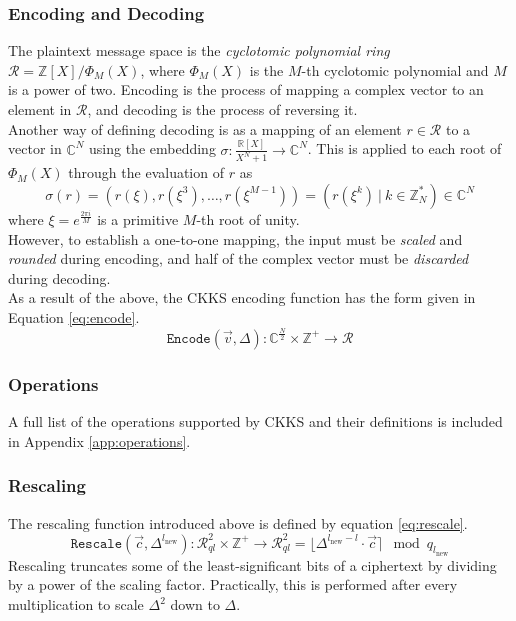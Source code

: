 \subsubsection{Encoding and Decoding}
\setlength{\leftskip}{0.5cm}
\indent \indent
The plaintext message space is the \textit{cyclotomic polynomial ring} $\mathcal{R} = \mathbb{Z}[X] / \Phi_M(X)$, where $\Phi_M(X)$ is the $M$-th cyclotomic polynomial and $M$ is a power of two. Encoding is the process of mapping a complex vector to an element in $\mathcal{R}$, and decoding is the process of reversing it.
\smallskip \\ \indent
Another way of defining decoding is as a mapping of an element $r \in \mathcal{R}$ to a vector in $\mathbb{C}^N$ using the embedding $\sigma : \frac{\mathbb{R}[X]}{X^N + 1} \rightarrow \mathbb{C}^N$. This is applied to each root of $\Phi_M(X)$ through the evaluation of $r$ as
\begin{equation}
    \sigma(r) = (r(\xi), r(\xi^3), \ldots, r(\xi^{M-1})) = (r(\xi^k) \: | \: k \in \mathbb{Z}^*_N) \in \mathbb{C}^N
\end{equation}
where $\xi = e^{\frac{2 \pi i}{M}}$ is a primitive $M$-th root of unity.
\smallskip \\ \indent
However, to establish a one-to-one mapping, the input must be \textit{scaled} and \textit{rounded} during encoding, and half of the complex vector must be \textit{discarded} during decoding.
\smallskip \\ \indent
As a result of the above, the CKKS encoding function has the form given in Equation \ref{eq:encode}.
\begin{equation}
    \label{eq:encode}
    \texttt{Encode}(\vec{v}, \Delta) : \mathbb{C}^\frac{N}{2} \times \mathbb{Z}^+ \rightarrow \mathcal{R}
\end{equation}

\setlength{\leftskip}{0cm}
\subsubsection{Operations}
\setlength{\leftskip}{0.5cm}
\indent \indent
A full list of the operations supported by CKKS and their definitions is included in Appendix \ref{app:operations}.


\setlength{\leftskip}{0cm}
\subsubsection{Rescaling}
\setlength{\leftskip}{0.5cm}
\indent \indent
The rescaling function introduced above is defined by equation \ref{eq:rescale}.
\begin{equation}
    \label{eq:rescale}
    \texttt{Rescale}(\vec{c}, \Delta^{l_\text{new}}) : \mathcal{R}^2_{ql} \times \mathbb{Z}^+ \rightarrow \mathcal{R}^2_{ql} = \lfloor \Delta^{l_\text{new} - l} \cdot \vec{c} \rceil \mod q_{l_\text{new}}
\end{equation}
Rescaling truncates some of the least-significant bits of a ciphertext by dividing by a power of the scaling factor. Practically, this is performed after every multiplication to scale $\Delta^2$ down to $\Delta$.

